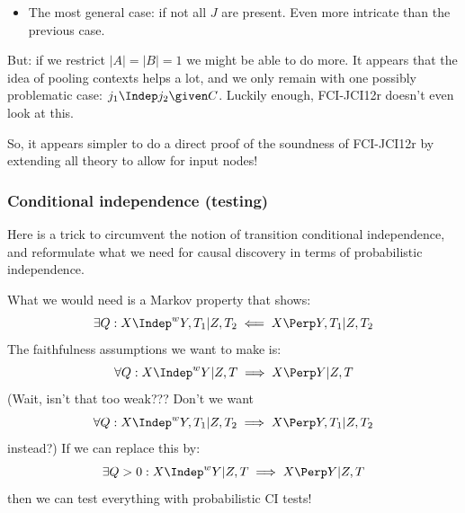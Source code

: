 \begin{itemize}
    indeed, the $\Prb(X_{J\sm C}|X_{C\cap J})$ becomes the surrogate exogenous distribution on $X_{J\sm C}$, the $X_{C\cap J}$ become `constants'. This means that for every conditioning set $C\cap J$ leads us to a different surrogate graphical representation of the exogenous distribution. This is what I had in mind a long time ago when I wanted to derive a `graphical' representation for an arbitrary CI model on the inputs and a CDMG CI model for the output given the input. 
    The fourth term seems a bit tricky: conditioning on output colliders might lead to additional dependences between input nodes; but only ``might''. Hm, we get into the intricacies of JCI-3 like faithfulness assumptions.
  \item The most general case: if not all $J$ are present. Even more intricate than the previous case.
\end{itemize}
But: if we restrict $|A|=|B|=1$ we might be able to do more. It appears that the idea of pooling contexts helps a lot, and we only remain with one possibly problematic case: $j_1 \Indep j_2 \given C$. Luckily enough, FCI-JCI12r doesn't even look at this.

So, it appears simpler to do a direct proof of the soundness of FCI-JCI12r by extending all theory to allow for input nodes!


\subsubsection{Conditional independence (testing)}

Here is a trick to circumvent the notion of transition conditional independence, and reformulate what we need for causal
discovery in terms of probabilistic independence.

What we would need is a Markov property that shows:
$$\exists Q : X \Indep^w Y,T_1 | Z,T_2 \impliedby X \Perp Y,T_1 | Z,T_2$$
The faithfulness assumptions we want to make is:
$$\forall Q : X \Indep^w Y | Z,T \implies X \Perp Y | Z,T$$
(Wait, isn't that too weak??? Don't we want
$$\forall Q : X \Indep^w Y,T_1 | Z,T_2 \implies X \Perp Y,T_1 | Z,T_2$$
instead?)
If we can replace this by:
$$\exists Q > 0 : X \Indep^w Y | Z,T \implies X \Perp Y | Z,T$$
then we can test everything with probabilistic CI tests!

